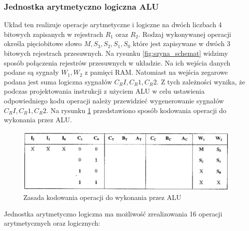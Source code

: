 \documentclass[../main.tex]{subfiles}
\begin{document}
        \subsubsection*{Jednostka arytmetyczno logiczna ALU}
        
        Układ ten realizuje operacje arytmetyczne i logiczne na dwóch liczbach 4 bitowych zapisanych w rejestrach $R_1$ oraz $R_2$.
        Rodzaj wykonywanej operacji określa pięciobitowe słowo $M, S_3, S_2, S_1, S_0$ które jest zapisywane w dwóch 3 bitowych rejestrach przesuwnych.
        Na rysunku \ref{fig:szyna_schemat} widzimy sposób połączenia rejestrów przesuwnych w układzie. Na ich wejścia danych podane są 
        sygnały $W_1, W_2$ z pamięci RAM. Natomiast na wejścia zegarowe podana jest suma logiczna sygnałów $C_RI, C_R1, C_R2$. Z tych zależności
        wynika, że podczas projektowania instrukcji z użyciem ALU w celu ustawienia odpowiedniego kodu operacji należy przewidzieć 
        wygenerowanie sygnałów $C_RI, C_R1, C_R2$. Na rysunku \ref{fig:kodowanie_alu} przedstawiono sposób kodowania operacji do wykonania przez ALU.

        \begin{figure}[H]
            \centering
            \includegraphics[width=\linewidth]{kodowanie_alu.png}
            \caption{Zasada kodowania operacji do wykonania przez ALU}
            \label{fig:kodowanie_alu}
        \end{figure}

        Jednostka arytmetyczno logiczna ma możliwość zrealizowania 16 operacji arytmetycznych oraz logicznych:
\end{document}
